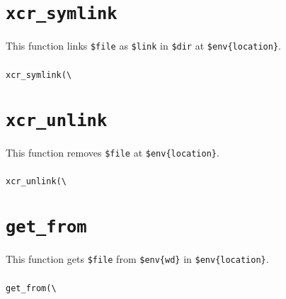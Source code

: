\documentclass[a4paper,10pt]{report}
\def\|{\verb|} %|
\begin{document}
\section{\texttt{xcr\_symlink}}

This function links \texttt{\$file} as \texttt{\$link} in
\texttt{\$dir} at \texttt{\$env\{location\}}.

\subsubsection{\format}

\begin{boxnote}
\begin{alltt}
xcr_symlink(\|\|%\textit{env}, $file, $dir, $link);
\end{alltt}
\end{boxnote}
\vspace{\baselineskip}

\section{\texttt{xcr\_unlink}}

This function removes \texttt{\$file} at \texttt{\$env\{location\}}.

\subsubsection{\format}

\begin{boxnote}
\begin{alltt}
xcr_unlink(\|\|%\textit{env}, $file);
\end{alltt}
\end{boxnote}
\vspace{\baselineskip}

\section{\texttt{get\_from}}

This function gets \texttt{\$file} from \texttt{\$env\{wd\}} in
\texttt{\$env\{location\}}.

\subsubsection{\format}

\begin{boxnote}
\begin{alltt}
get_from(\|\|%\textit{env}, $file);
\end{alltt}
\end{boxnote}
\vspace{\baselineskip}
\end{document}
